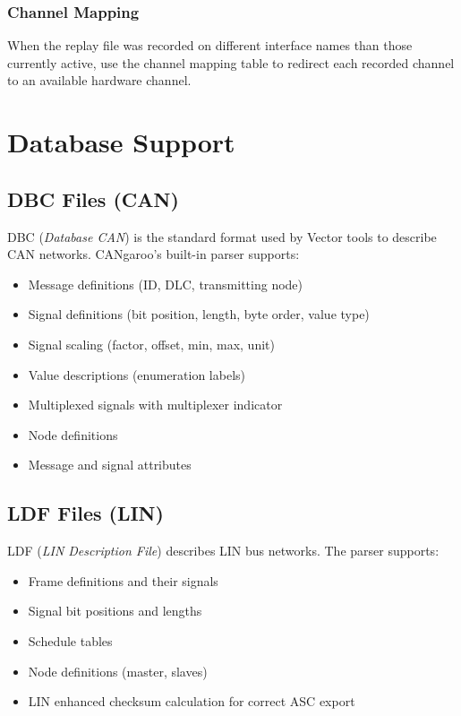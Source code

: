 \documentclass[a4paper,11pt]{article}
\begin{document}
\subsubsection{Channel Mapping}

When the replay file was recorded on different interface names than those currently
active, use the channel mapping table to redirect each recorded channel to an
available hardware channel.

\section{Database Support}

\subsection{DBC Files (CAN)}

DBC (\textit{Database CAN}) is the standard format used by Vector tools to describe
CAN networks. CANgaroo's built-in parser supports:

\begin{itemize}
  \item Message definitions (ID, DLC, transmitting node)
  \item Signal definitions (bit position, length, byte order, value type)
  \item Signal scaling (factor, offset, min, max, unit)
  \item Value descriptions (enumeration labels)
  \item Multiplexed signals with multiplexer indicator
  \item Node definitions
  \item Message and signal attributes
\end{itemize}

\subsection{LDF Files (LIN)}

LDF (\textit{LIN Description File}) describes LIN bus networks. The parser supports:

\begin{itemize}
  \item Frame definitions and their signals
  \item Signal bit positions and lengths
  \item Schedule tables
  \item Node definitions (master, slaves)
  \item LIN enhanced checksum calculation for correct ASC export
\end{itemize}
\end{document}
